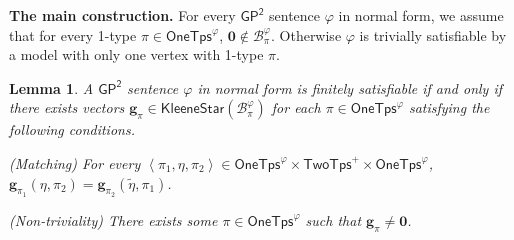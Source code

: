 \documentclass[10pt,a4paper]{article}
\newtheorem{lemma}[theorem]{Lemma}
\theoremstyle{definition}
\theoremstyle{remark}
\newcommand{\myparagraph}[1]{\medskip\noindent \textbf{#1.}}
\newcommand{\cB}{\mathcal{B}}
\newcommand{\bfg}{\mathbf{g}}
\newcommand{\bfzero}{\mathbf{0}}
\newcommand{\twotypes}{\mathsf{TwoTps}}
\newcommand{\Onetypes}{\mathsf{OneTps}}
\newcommand{\GPtwo}   {\mathsf{GP^2}}
\newcommand{\tuple}[1]       {\left\langle #1 \right\rangle}
\newcommand{\dual}[1] {\widetilde{ #1 }}
\newcommand{\kstar}[1] {\mathsf{KleeneStar}\left( #1 \right)}
\begin{document}
\myparagraph{The main construction}
For every $\GPtwo$ sentence $\varphi$ in normal form,
we assume that
for every 1-type $\pi \in \Onetypes^\varphi$,
$\bfzero \not\in \cB^{\varphi}_{\pi}$.
Otherwise $\varphi$ is trivially satisfiable
by a model with only one vertex with 1-type $\pi$. 

\begin{lemma}\label{lem:equiv1}
    A $\GPtwo$ sentence $\varphi$ in normal form is finitely satisfiable
    if and only if there exists vectors $\bfg_\pi \in \kstar{\cB^\varphi_\pi}$ for each $\pi \in \Onetypes^\varphi$ satisfying the following conditions. 
    \begin{compactitem}
        \item (Matching) For every $\tuple{\pi_1, \eta, \pi_2} \in \Onetypes^\varphi \times \twotypes^+ \times \Onetypes^\varphi$,
        $\bfg_{\pi_1}(\eta, \pi_2) = \bfg_{\pi_2}(\dual{\eta}, \pi_1)$.

        \item (Non-triviality) There exists some $\pi \in \Onetypes^\varphi$ such that $\bfg_\pi \neq \bfzero$.
    \end{compactitem}
\end{lemma}
\end{document}
